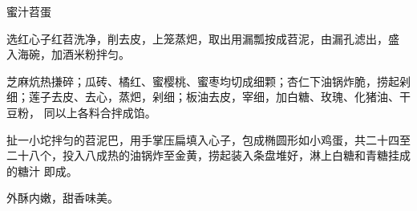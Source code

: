 %
%
%
%
%
%
%
\begin{recipe}[八宝苕蛋]{蜜汁苕蛋}

\ingredients


\preparation

\step 选红心子红苕洗净，削去皮，上笼蒸𤆵，取出用漏瓢按成苕泥，由漏孔滤出，盛
入海碗，加酒米粉拌匀。

\step 芝麻炕热搛碎；瓜砖、橘红、蜜樱桃、蜜枣均切成细颗；杏仁下油锅炸脆，捞起剁
细；莲子去皮、去心，蒸𤆵，剁细；板油去皮，宰细，加白糖、玫瑰、化猪油、干豆粉，
同以上各料合拌成馅。

\step 扯一小坨拌匀的苕泥巴，用手掌压扁填入心子，包成椭圆形如小鸡蛋，共二十四至
二十八个，投入八成热的油锅炸至金黄，捞起装入条盘堆好，淋上白糖和青糖挂成的糖汁
即成。

\features

外酥内嫩，甜香味美。

\end{recipe}

